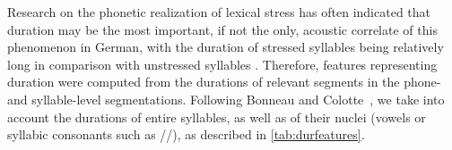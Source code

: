 \documentclass[a4paper]{article}
\begin{document}
	    Research on the phonetic realization of lexical stress has often indicated that duration may be the most important, if not the only, acoustic correlate of this phenomenon in German, with the duration of stressed syllables being relatively long in comparison with unstressed syllables \cite{Dogil1999}. 
	    Therefore, features representing duration were computed 
	    from the durations of relevant segments in the phone- and syllable-level segmentations. Following Bonneau and Colotte~\cite{Bonneau2011}, we take into account the durations of entire syllables, as well as of their nuclei (vowels or syllabic consonants such as //), as described in \cref{tab:durfeatures}.
	    
\end{document}
